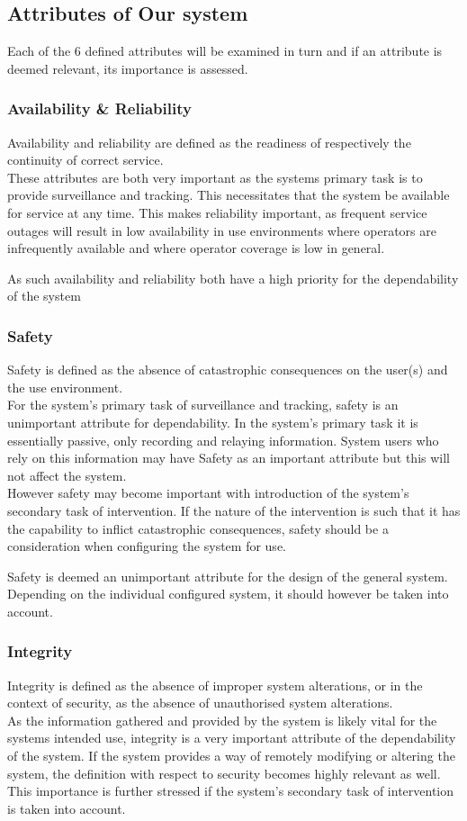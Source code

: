 \subsection{Attributes of Our system}
Each of the 6 defined attributes will be examined in turn and if an attribute is deemed relevant, its importance is assessed.\

\subsubsection{Availability \& Reliability}
Availability and reliability are defined as the readiness of respectively the continuity of correct service.\\
These attributes are both very important as the systems primary task is to provide surveillance and tracking.
This necessitates that the system be available for service at any time.
This makes reliability important, as frequent service outages will result in low availability in use environments 
where operators are infrequently available and where operator coverage is low in general.

As such availability and reliability both have a high priority for the dependability of the system

\subsubsection{Safety}
Safety is defined as the absence of catastrophic consequences on the user(s) and the use environment.\\
For the system's primary task of surveillance and tracking, safety is an unimportant attribute for dependability.
In the system's primary task it is essentially passive, only recording and relaying information.
System users who rely on this information may have Safety as an important attribute but this will not affect the system.\\
However safety may become important with introduction of the system's secondary task of intervention.
If the nature of the intervention is such that it has the capability to inflict catastrophic consequences,
safety should be a consideration when configuring the system for use.

Safety is deemed an unimportant attribute for the design of the general system.
Depending on the individual configured system, it should however be taken into account.

\subsubsection{Integrity}
Integrity is defined as the absence of improper system alterations, or in the context of security, as the absence of unauthorised system alterations.\\
As the information gathered and provided by the system is likely vital for the systems intended use, integrity is a very important attribute of the dependability of the system.
If the system provides a way of remotely modifying or altering the system, the definition with respect to security becomes highly relevant as well.
This importance is further stressed if the system's secondary task of intervention is taken into account.

